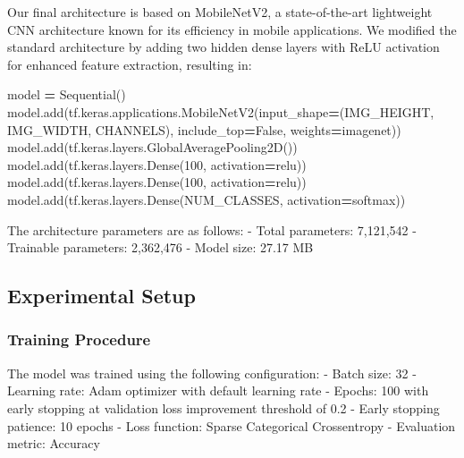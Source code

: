 \documentclass[
]{article}
\newenvironment{Shaded}{\begin{snugshade}}{\end{snugshade}}
\newcommand{\DecValTok}[1]{\textcolor[rgb]{0.00,0.00,0.81}{#1}}
\newcommand{\NormalTok}[1]{#1}
\newcommand{\OperatorTok}[1]{\textcolor[rgb]{0.81,0.36,0.00}{\textbf{#1}}}
\newcommand{\StringTok}[1]{\textcolor[rgb]{0.31,0.60,0.02}{#1}}
\newcommand{\VariableTok}[1]{\textcolor[rgb]{0.00,0.00,0.00}{#1}}
\begin{document}
Our final architecture is based on MobileNetV2, a state-of-the-art
lightweight CNN architecture known for its efficiency in mobile
applications. We modified the standard architecture by adding two hidden
dense layers with ReLU activation for enhanced feature extraction,
resulting in:

\begin{Shaded}
\begin{Highlighting}[]
\NormalTok{model }\OperatorTok{=}\NormalTok{ Sequential()}
\NormalTok{model.add(tf.keras.applications.MobileNetV2(input\_shape}\OperatorTok{=}\NormalTok{(IMG\_HEIGHT, IMG\_WIDTH, CHANNELS),}
\NormalTok{                         include\_top}\OperatorTok{=}\VariableTok{False}\NormalTok{, }
\NormalTok{                         weights}\OperatorTok{=}\StringTok{\textquotesingle{}imagenet\textquotesingle{}}\NormalTok{))}
\NormalTok{model.add(tf.keras.layers.GlobalAveragePooling2D())}
\NormalTok{model.add(tf.keras.layers.Dense(}\DecValTok{100}\NormalTok{, activation}\OperatorTok{=}\StringTok{\textquotesingle{}relu\textquotesingle{}}\NormalTok{))}
\NormalTok{model.add(tf.keras.layers.Dense(}\DecValTok{100}\NormalTok{, activation}\OperatorTok{=}\StringTok{\textquotesingle{}relu\textquotesingle{}}\NormalTok{))}
\NormalTok{model.add(tf.keras.layers.Dense(NUM\_CLASSES, activation}\OperatorTok{=}\StringTok{\textquotesingle{}softmax\textquotesingle{}}\NormalTok{))}
\end{Highlighting}
\end{Shaded}

The architecture parameters are as follows: - Total parameters:
7,121,542 - Trainable parameters: 2,362,476 - Model size: 27.17 MB

\subsection{Experimental Setup}\label{experimental-setup}

\subsubsection{Training Procedure}\label{training-procedure}

The model was trained using the following configuration: - Batch size:
32 - Learning rate: Adam optimizer with default learning rate - Epochs:
100 with early stopping at validation loss improvement threshold of 0.2
- Early stopping patience: 10 epochs - Loss function: Sparse Categorical
Crossentropy - Evaluation metric: Accuracy
\end{document}
